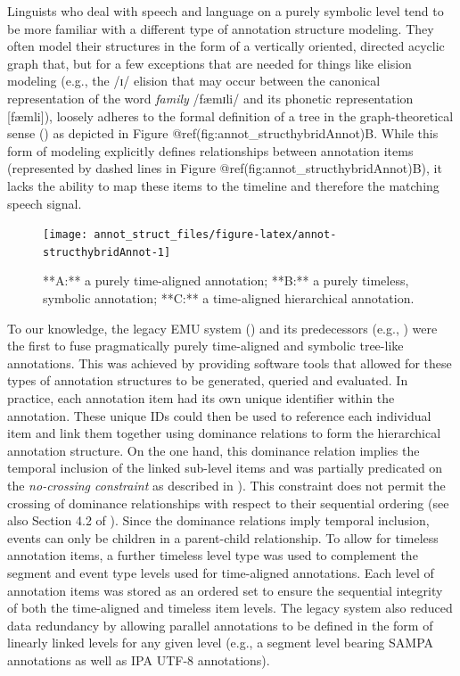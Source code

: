 \documentclass[]{book}
\theoremstyle{definition}
\theoremstyle{definition}
\theoremstyle{definition}
\theoremstyle{remark}
\begin{document}
Linguists who deal with speech and language on a purely symbolic level
tend to be more familiar with a different type of annotation structure
modeling. They often model their structures in the form of a vertically
oriented, directed acyclic graph that, but for a few exceptions that are
needed for things like elision modeling (e.g., the /ɪ/ elision that may
occur between the canonical representation of the word \emph{family}
/fæmɪli/ and its phonetic representation {[}fæmli{]}), loosely adheres
to the formal definition of a tree in the graph-theoretical sense
(\citet{knuth:ar1968a}) as depicted in Figure
@ref(fig:annot\_structhybridAnnot)B. While this form of modeling
explicitly defines relationships between annotation items (represented
by dashed lines in Figure @ref(fig:annot\_structhybridAnnot)B), it lacks
the ability to map these items to the timeline and therefore the
matching speech signal.

\begin{figure}

{\centering \texttt{[image: annot\_struct\_files/figure-latex/annot-structhybridAnnot-1]} 

}

\caption{**A:** a purely time-aligned annotation; **B:** a purely timeless, symbolic annotation; **C:** a time-aligned hierarchical annotation.}\label{fig:annot-structhybridAnnot}
\end{figure}

To our knowledge, the legacy EMU system (\citet{cassidy:sc2001a}) and
its predecessors (e.g., \citet{harrington:csl1993a}) were the first to
fuse pragmatically purely time-aligned and symbolic tree-like
annotations. This was achieved by providing software tools that allowed
for these types of annotation structures to be generated, queried and
evaluated. In practice, each annotation item had its own unique
identifier within the annotation. These unique IDs could then be used to
reference each individual item and link them together using dominance
relations to form the hierarchical annotation structure. On the one
hand, this dominance relation implies the temporal inclusion of the
linked sub-level items and was partially predicated on the
\emph{no-crossing constraint} as described in \citet{coleman:lp1991a}).
This constraint does not permit the crossing of dominance relationships
with respect to their sequential ordering (see also Section 4.2 of
\citet{cassidy:sc2001a}). Since the dominance relations imply temporal
inclusion, events can only be children in a parent-child relationship.
To allow for timeless annotation items, a further timeless level type
was used to complement the segment and event type levels used for
time-aligned annotations. Each level of annotation items was stored as
an ordered set to ensure the sequential integrity of both the
time-aligned and timeless item levels. The legacy system also reduced
data redundancy by allowing parallel annotations to be defined in the
form of linearly linked levels for any given level (e.g., a segment
level bearing SAMPA annotations as well as IPA UTF-8 annotations).
\end{document}
